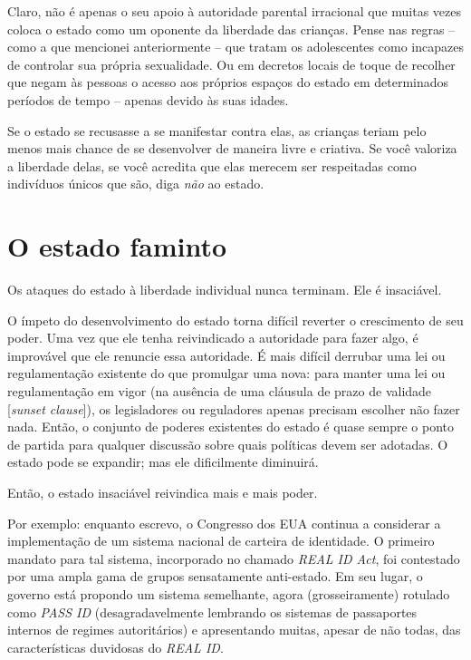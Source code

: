 Claro, não é apenas o seu apoio à autoridade parental irracional que muitas vezes coloca o estado como um oponente da liberdade das crianças. Pense nas regras -- como a que mencionei anteriormente -- que tratam os adolescentes como incapazes de controlar sua própria sexualidade. Ou em decretos locais de toque de recolher que negam às pessoas o acesso aos próprios espaços do estado em determinados períodos de tempo -- apenas devido às suas idades.

Se o estado se recusasse a se manifestar contra elas, as crianças teriam pelo menos mais chance de se desenvolver de maneira livre e criativa. Se você valoriza a liberdade delas, se você acredita que elas merecem ser respeitadas como indivíduos únicos que são, diga \emph{não} ao estado.

\section{O estado faminto}

Os ataques do estado à liberdade individual nunca terminam. Ele é insaciável.

O ímpeto do desenvolvimento do estado torna difícil reverter o crescimento de seu poder. Uma vez que ele tenha reivindicado a autoridade para fazer algo, é improvável que ele renuncie essa autoridade. É mais difícil derrubar uma lei ou regulamentação existente do que promulgar uma nova: para manter uma lei ou regulamentação em vigor (na ausência de uma cláusula de prazo de validade [\emph{sunset clause}]), os legisladores ou reguladores apenas precisam escolher não fazer nada. Então, o conjunto de poderes existentes do estado é quase sempre o ponto de partida para qualquer discussão sobre quais políticas devem ser adotadas. O estado pode se expandir; mas ele dificilmente diminuirá.

Então, o estado insaciável reivindica mais e mais poder.

Por exemplo: enquanto escrevo, o Congresso dos EUA continua a considerar a implementação de um sistema nacional de carteira de identidade. O primeiro mandato para tal sistema, incorporado no chamado \emph{REAL ID Act}, foi contestado por uma ampla gama de grupos sensatamente anti-estado. Em seu lugar, o governo está propondo um sistema semelhante, agora (grosseiramente) rotulado como \emph{PASS ID} (desagradavelmente lembrando os sistemas de passaportes internos de regimes autoritários) e apresentando muitas, apesar de não todas, das características duvidosas do \emph{REAL ID}.

